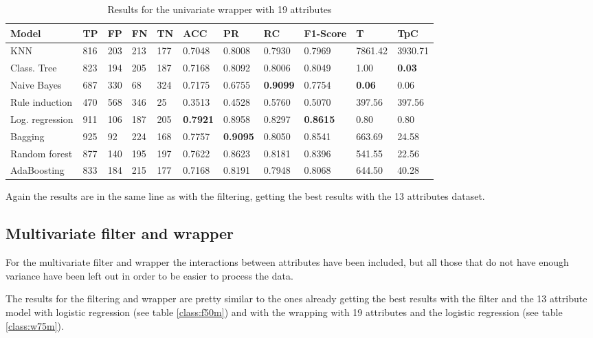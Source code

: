 \documentclass[a4paper,11pt]{article}
\begin{document}
\begin{table}
\centering
\begin{tabular}{|l|l|l|l|l|l|l|l|l|l|l|}
\hline

\textbf{Model} & \textbf{TP} & \textbf{FP} & \textbf{FN} & \textbf{TN} & \textbf{ACC} & \textbf{PR} & \textbf{RC} & \textbf{F1-Score} & \textbf{T} & \textbf{TpC} \\ \hline
KNN & 816 & 203 & 213 & 177 & 0.7048 & 0.8008 & 0.7930 & 0.7969 & 7861.42 & 3930.71 \\ \hline
Class. Tree & 823 & 194 & 205 & 187 & 0.7168 & 0.8092 & 0.8006 & 0.8049 & 1.00 & \textbf{0.03} \\ \hline
Naive Bayes & 687 & 330 & 68 & 324 & 0.7175 & 0.6755 & \textbf{0.9099} & 0.7754 & \textbf{0.06} & 0.06 \\ \hline
Rule induction & 470 & 568 & 346 & 25 & 0.3513 & 0.4528 & 0.5760 & 0.5070 & 397.56 & 397.56 \\ \hline
Log. regression & 911 & 106 & 187 & 205 & \textbf{0.7921} & 0.8958 & 0.8297 & \textbf{0.8615} & 0.80 & 0.80 \\ \hline
Bagging & 925 & 92 & 224 & 168 & 0.7757 & \textbf{0.9095} & 0.8050 & 0.8541 & 663.69 & 24.58 \\ \hline
Random forest & 877 & 140 & 195 & 197 & 0.7622 & 0.8623 & 0.8181 & 0.8396 & 541.55 & 22.56 \\ \hline
AdaBoosting & 833 & 184 & 215 & 177 & 0.7168 & 0.8191 & 0.7948 & 0.8068 & 644.50 & 40.28 \\ \hline

\end{tabular}
\caption{Results for the univariate wrapper with 19 attributes}
\label{class:w75u}
\end{table}

Again the results are in the same line as with the filtering, getting the best results with the 13 attributes dataset.

\subsection{Multivariate filter and wrapper}

For the multivariate filter and wrapper the interactions between attributes have been included, but all those that do not have enough variance have been left out in order to be easier to process the data.

The results for the filtering and wrapper are pretty similar to the ones already  getting the best results with the filter and the 13 attribute model with logistic regression (see table \ref{class:f50m}) and with the wrapping with 19 attributes and the logistic regression (see table \ref{class:w75m}).
\end{document}
